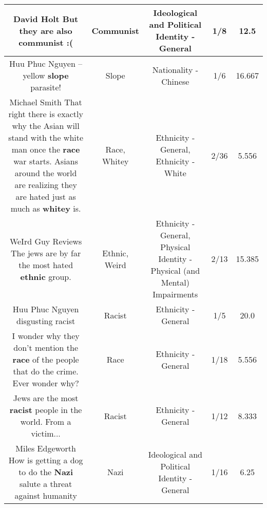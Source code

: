 \documentclass[11pt]{article}
\newlength\mylength
\begin{document}
\begin{center}
\begin{longtable}{|C{.65\mylength}|C{.30\mylength}|C{.12\mylength}|C{.12\mylength}|C{.12\mylength}|}
  \small David Holt But they are also \textbf{communist} :(\normalsize   & Communist &  Ideological and Political Identity - General & 1/8 & 12.5 \\  \hline
  \small Huu Phuc Nguyen --yellow \textbf{slope} parasite!\normalsize   & Slope & Nationality - Chinese & 1/6 & 16.667 \\  \hline
  \small Michael Smith That right there is exactly why the Asian will stand with the white man once the \textbf{race} war starts. Asians around the world are realizing they are hated just as much as \textbf{whitey} is.\normalsize   & Race, Whitey & Ethnicity - General, Ethnicity - White & 2/36 & 5.556 \\  \hline
  \small WeIrd Guy  Reviews The jews are by far the most hated \textbf{ethnic} group.\normalsize   & Ethnic, Weird & Ethnicity - General, Physical Identity - Physical (and Mental) Impairments & 2/13 & 15.385 \\  \hline
  \small Huu Phuc Nguyen disgusting racist\normalsize   & Racist & Ethnicity - General & 1/5 & 20.0 \\  \hline
  \small I wonder why they don't mention the \textbf{race} of the people that do the crime. Ever wonder why?\normalsize   & Race & Ethnicity - General & 1/18 & 5.556 \\  \hline
  \small Jews are the most \textbf{racist} people in the world. From a victim...\normalsize   & Racist & Ethnicity - General & 1/12 & 8.333 \\  \hline
  \small Miles Edgeworth How is getting a dog to do the \textbf{Nazi} salute a threat against humanity\normalsize   & Nazi &  Ideological and Political Identity - General & 1/16 & 6.25 \\  \hline

\end{longtable}
\end{center}
\end{document}
